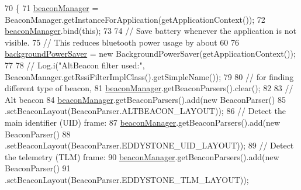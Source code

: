 \begin{DoxyCode}
70                                            \{
71         \hyperlink{classit_1_1unibo_1_1torsello_1_1bluetoothpositioning_1_1activities_1_1ApplicationActivity_a973c37226a3dbba6016966c3555aff65_a973c37226a3dbba6016966c3555aff65}{beaconManager} = BeaconManager.getInstanceForApplication(getApplicationContext());
72         \hyperlink{classit_1_1unibo_1_1torsello_1_1bluetoothpositioning_1_1activities_1_1ApplicationActivity_a973c37226a3dbba6016966c3555aff65_a973c37226a3dbba6016966c3555aff65}{beaconManager}.bind(\textcolor{keyword}{this});
73 
74         \textcolor{comment}{// Save battery whenever the application is not visible.}
75         \textcolor{comment}{// This reduces bluetooth power usage by about 60%
76         \hyperlink{classit_1_1unibo_1_1torsello_1_1bluetoothpositioning_1_1activities_1_1ApplicationActivity_a85885639575161f4d73d4fc788f44ace_a85885639575161f4d73d4fc788f44ace}{backgroundPowerSaver} = \textcolor{keyword}{new} BackgroundPowerSaver(getApplicationContext());
77 
78 \textcolor{comment}{//        Log.i("AltBeacon filter used:", BeaconManager.getRssiFilterImplClass().getSimpleName());}
79 
80         \textcolor{comment}{// for finding different type of beacon,}
81         \hyperlink{classit_1_1unibo_1_1torsello_1_1bluetoothpositioning_1_1activities_1_1ApplicationActivity_a973c37226a3dbba6016966c3555aff65_a973c37226a3dbba6016966c3555aff65}{beaconManager}.getBeaconParsers().clear();
82 
83         \textcolor{comment}{// Alt beacon}
84         \hyperlink{classit_1_1unibo_1_1torsello_1_1bluetoothpositioning_1_1activities_1_1ApplicationActivity_a973c37226a3dbba6016966c3555aff65_a973c37226a3dbba6016966c3555aff65}{beaconManager}.getBeaconParsers().add(\textcolor{keyword}{new} BeaconParser()
85                 .setBeaconLayout(BeaconParser.ALTBEACON\_LAYOUT));
86         \textcolor{comment}{// Detect the main identifier (UID) frame:}
87         \hyperlink{classit_1_1unibo_1_1torsello_1_1bluetoothpositioning_1_1activities_1_1ApplicationActivity_a973c37226a3dbba6016966c3555aff65_a973c37226a3dbba6016966c3555aff65}{beaconManager}.getBeaconParsers().add(\textcolor{keyword}{new} BeaconParser()
88                 .setBeaconLayout(BeaconParser.EDDYSTONE\_UID\_LAYOUT));
89         \textcolor{comment}{// Detect the telemetry (TLM) frame:}
90         \hyperlink{classit_1_1unibo_1_1torsello_1_1bluetoothpositioning_1_1activities_1_1ApplicationActivity_a973c37226a3dbba6016966c3555aff65_a973c37226a3dbba6016966c3555aff65}{beaconManager}.getBeaconParsers().add(\textcolor{keyword}{new} BeaconParser()
91                 .setBeaconLayout(BeaconParser.EDDYSTONE\_TLM\_LAYOUT));
}
\end{DoxyCode}
